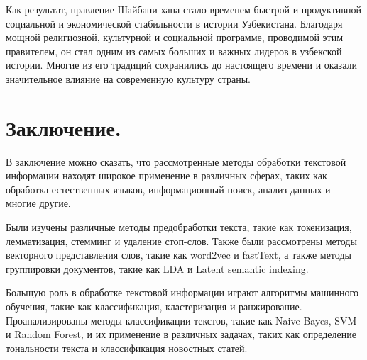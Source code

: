 \documentclass[draft]{article}
\begin{document}
Как результат, правление Шайбани-хана стало временем быстрой и продуктивной социальной и экономической стабильности в истории Узбекистана. Благодаря мощной религиозной, культурной и социальной программе, проводимой этим правителем, он стал одним из самых больших и важных лидеров в узбекской истории. Многие из его традиций сохранились до настоящего времени и оказали значительное влияние на современную культуру страны.\newpage\section{Заключение.}
В заключение можно сказать, что рассмотренные методы обработки текстовой информации находят широкое применение в различных сферах, таких как обработка естественных языков, информационный поиск, анализ данных и многие другие.

Были изучены различные методы предобработки текста, такие как токенизация, лемматизация, стемминг и удаление стоп-слов. Также были рассмотрены методы векторного представления слов, такие как word2vec и fastText, а также методы группировки документов, такие как LDA и Latent semantic indexing.

Большую роль в обработке текстовой информации играют алгоритмы машинного обучения, такие как классификация, кластеризация и ранжирование. Проанализированы методы классификации текстов, такие как Naive Bayes, SVM и Random Forest, и их применение в различных задачах, таких как определение тональности текста и классификация новостных статей.
\end{document}
